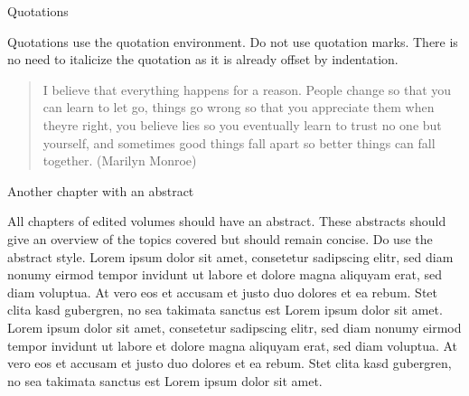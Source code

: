 \begin{styleHeadingii}
Quotations
\end{styleHeadingii}

\begin{styleTextbody}
Quotations use the quotation environment. Do not use quotation marks. There is no need to italicize the quotation as it is already offset by indentation. 
\end{styleTextbody}

\begin{quotation}
I believe that everything happens for a reason. People change so that you can learn to let go, things go wrong so that you appreciate them when they{\textquotesingle}re right, you believe lies so you eventually learn to trust no one but yourself, and sometimes good things fall apart so better things can fall together. (Marilyn Monroe) 

\end{quotation}
\begin{styleHeadingi}
Another chapter with an abstract
\end{styleHeadingi}

\begin{styleAbstract}
All chapters of edited volumes should have an abstract. These abstracts should give an overview of the topics covered but should remain concise. Do use the abstract style.\newline
Lorem ipsum dolor sit amet, consetetur sadipscing elitr, sed diam nonumy eirmod tempor invidunt ut labore et dolore magna aliquyam erat, sed diam voluptua. At vero eos et accusam et justo duo dolores et ea rebum. Stet clita kasd gubergren, no sea takimata sanctus est Lorem ipsum dolor sit amet. Lorem ipsum dolor sit amet, consetetur sadipscing elitr, sed diam nonumy eirmod tempor invidunt ut labore et dolore magna aliquyam erat, sed diam voluptua. At vero eos et accusam et justo duo dolores et ea rebum. Stet clita kasd gubergren, no sea takimata sanctus est Lorem ipsum dolor sit amet.
\end{styleAbstract}

